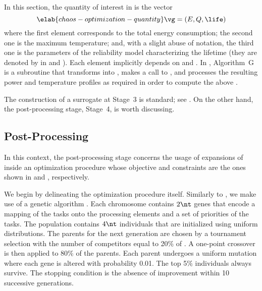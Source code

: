 In this section, the quantity of interest \g in  is the
vector
\begin{equation} \elab{chaos-optimization-quantity}
  \vg = (E, Q, \life)
\end{equation}
where the first element corresponds to the total energy consumption; the second
one is the maximum temperature; and, with a slight abuse of notation, the third
one is the parameters of the reliability model characterizing the lifetime (they
are denoted by \vg in  and
). Each element implicitly depends on \schedule
and \vu. In , Algorithm~G is a subroutine that
transforms \vz into \vu, makes a call to
, and processes the resulting
power and temperature profiles as required in order to compute the above \vg.

The construction of a surrogate at Stage~3 is standard; see
. On the other hand, the post-processing stage,
Stage~4, is worth discussing.

\subsection{Post-Processing}

In this context, the post-processing stage concerns the usage of expansions of
 inside an optimization procedure whose
objective and constraints are the ones shown in
 and ,
respectively.

We begin by delineating the optimization procedure itself. Similarly to
, we make use of a genetic algorithm
\cite{schmitz2004}. Each chromosome contains $2 \nt$ genes that encode a mapping
of the tasks onto the processing elements and a set of priorities of the tasks.
The population contains $4 \nt$ individuals that are initialized using uniform
distributions. The parents for the next generation are chosen by a tournament
selection with the number of competitors equal to 20\% of \nt. A one-point
crossover is then applied to 80\% of the parents. Each parent undergoes a
uniform mutation where each gene is altered with probability 0.01. The top 5\%
individuals always survive. The stopping condition is the absence of improvement
within 10 successive generations.

